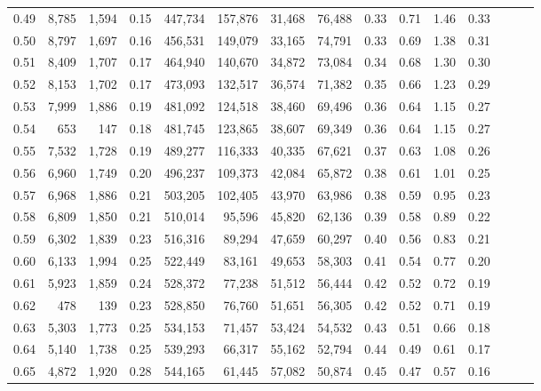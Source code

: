 \begin{tabular}{rrrrrrrrrrrrrrr}
0.49 &   8,785 &  1,594 &  0.15 &  447,734 &  157,876 &   31,468 &   76,488 &  0.33 &  0.71 &  1.46 &      0.33 \\
0.50 &   8,797 &  1,697 &  0.16 &  456,531 &  149,079 &   33,165 &   74,791 &  0.33 &  0.69 &  1.38 &      0.31 \\
0.51 &   8,409 &  1,707 &  0.17 &  464,940 &  140,670 &   34,872 &   73,084 &  0.34 &  0.68 &  1.30 &      0.30 \\
0.52 &   8,153 &  1,702 &  0.17 &  473,093 &  132,517 &   36,574 &   71,382 &  0.35 &  0.66 &  1.23 &      0.29 \\
0.53 &   7,999 &  1,886 &  0.19 &  481,092 &  124,518 &   38,460 &   69,496 &  0.36 &  0.64 &  1.15 &      0.27 \\
0.54 &     653 &    147 &  0.18 &  481,745 &  123,865 &   38,607 &   69,349 &  0.36 &  0.64 &  1.15 &      0.27 \\
0.55 &   7,532 &  1,728 &  0.19 &  489,277 &  116,333 &   40,335 &   67,621 &  0.37 &  0.63 &  1.08 &      0.26 \\
0.56 &   6,960 &  1,749 &  0.20 &  496,237 &  109,373 &   42,084 &   65,872 &  0.38 &  0.61 &  1.01 &      0.25 \\
0.57 &   6,968 &  1,886 &  0.21 &  503,205 &  102,405 &   43,970 &   63,986 &  0.38 &  0.59 &  0.95 &      0.23 \\
0.58 &   6,809 &  1,850 &  0.21 &  510,014 &   95,596 &   45,820 &   62,136 &  0.39 &  0.58 &  0.89 &      0.22 \\
0.59 &   6,302 &  1,839 &  0.23 &  516,316 &   89,294 &   47,659 &   60,297 &  0.40 &  0.56 &  0.83 &      0.21 \\
0.60 &   6,133 &  1,994 &  0.25 &  522,449 &   83,161 &   49,653 &   58,303 &  0.41 &  0.54 &  0.77 &      0.20 \\
0.61 &   5,923 &  1,859 &  0.24 &  528,372 &   77,238 &   51,512 &   56,444 &  0.42 &  0.52 &  0.72 &      0.19 \\
0.62 &     478 &    139 &  0.23 &  528,850 &   76,760 &   51,651 &   56,305 &  0.42 &  0.52 &  0.71 &      0.19 \\
0.63 &   5,303 &  1,773 &  0.25 &  534,153 &   71,457 &   53,424 &   54,532 &  0.43 &  0.51 &  0.66 &      0.18 \\
0.64 &   5,140 &  1,738 &  0.25 &  539,293 &   66,317 &   55,162 &   52,794 &  0.44 &  0.49 &  0.61 &      0.17 \\
0.65 &   4,872 &  1,920 &  0.28 &  544,165 &   61,445 &   57,082 &   50,874 &  0.45 &  0.47 &  0.57 &      0.16 \\

\end{tabular}

